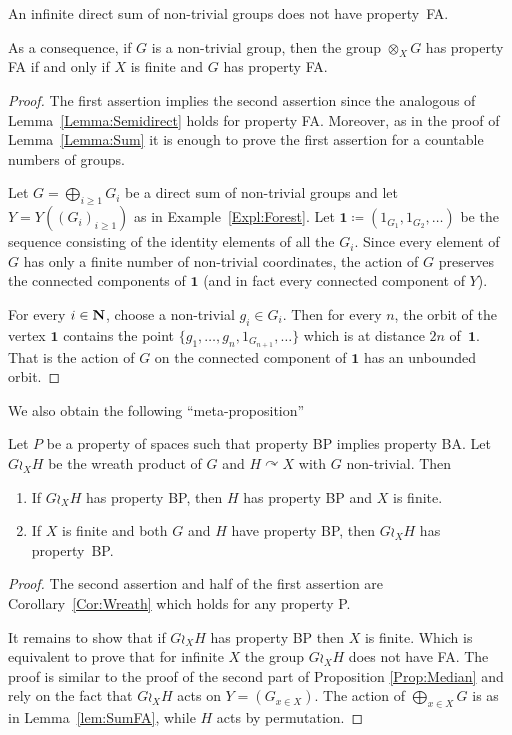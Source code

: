 \begin{lem}\label{lem:SumFA}
An infinite direct sum of non-trivial groups does not have property~FA.

As a consequence, if  $G$ is a non-trivial group, then 
the group $\otimes_X G$ has property FA if and only if $X$ is finite and $G$ has property FA.
\end{lem}
\begin{proof}
The first assertion implies the second assertion since the analogous of Lemma~\ref{Lemma:Semidirect} holds for property FA.
Moreover, as in the proof of Lemma~\ref{Lemma:Sum} it is enough to prove the first assertion for a countable numbers of groups.

Let $G=\bigoplus_{i\geq 1} G_i$ be a direct sum of non-trivial groups and let $Y=Y((G_i)_{i\geq 1})$ as in Example~\ref{Expl:Forest}.
Let $\mathbf 1\coloneqq(1_{G_1},1_{G_2},\dots)$ be the sequence consisting of the identity elements of all the $G_i$.
Since every element of $G$ has only a finite number of non-trivial coordinates, the action of $G$ preserves the connected components of $\mathbf 1$ (and in fact every connected component of $Y$).

For every $i\in \mathbf{N}$, choose a non-trivial $g_i\in G_i$.
Then for every $n$, the orbit of the vertex $\mathbf 1$ contains the point $\{g_1,\dots, g_n,1_{G_{n+1}},\dots\}$ which is at distance $2n$ of~$\mathbf 1$.
That is the action of $G$ on the connected component of $\mathbf 1$ has an unbounded orbit.
\end{proof}
We also obtain the following ``meta-proposition''
\begin{prop}\label{Prop:Tree}
Let $P$ be a property of spaces such that property BP implies property BA.
Let $G\wr_X H$ be the wreath product of $G$ and $H\curvearrowright X$ with $G$ non-trivial.
Then
\begin{enumerate}
\item
If $G\wr_X H$ has property BP, then $H$ has property BP and $X$ is finite.
\item
If $X$ is finite and both $G$ and $H$ have property BP, then $G\wr_X H$ has property~BP.
\end{enumerate}
\end{prop}
\begin{proof}
The second assertion and half of the first assertion are Corollary~\ref{Cor:Wreath} which holds for any property P.

It remains to show that if $G\wr_X H$ has property BP then $X$ is finite. Which is equivalent to prove that for infinite $X$ the group $G\wr_X H$ does not have FA.
The proof is similar to the proof of the second part of Proposition \ref{Prop:Median} and rely on the fact that $G\wr_X H$ acts on $Y=(G_{x\in X})$.
The action of $\bigoplus_{x\in X}G$ is as in Lemma~\ref{lem:SumFA}, while $H$ acts by permutation.
\end{proof}

